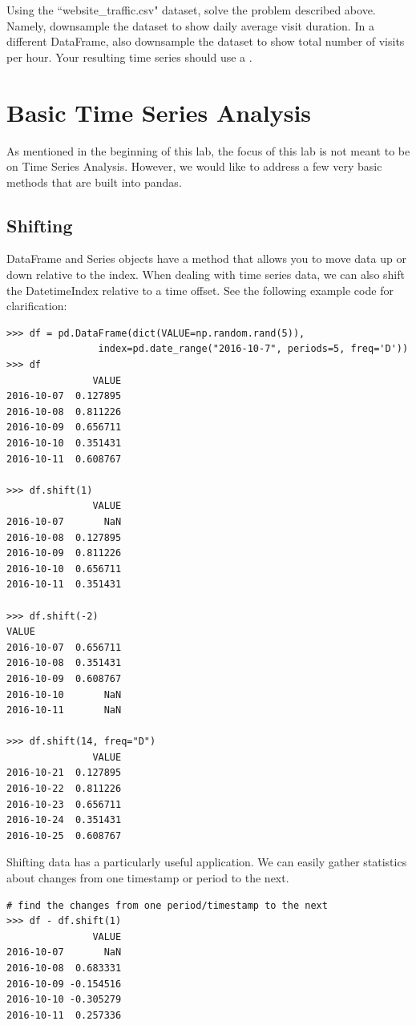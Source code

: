 \begin{problem}
Using the ``website\_traffic.csv" dataset, solve the problem described above. Namely, downsample the dataset to show daily average visit duration. In a different DataFrame, also downsample the dataset to show total number of visits per hour. Your resulting time series should use a .
\end{problem}

\section*{Basic Time Series Analysis}
As mentioned in the beginning of this lab, the focus of this lab is not meant to be on Time Series Analysis. However, we would like to address a few very basic methods that are built into pandas.

\subsection*{Shifting}
DataFrame and Series objects have a  method that allows you to move data up or down relative to the index. When dealing with time series data, we can also shift the DatetimeIndex relative to a time offset. See the following example code for clarification:

\begin{lstlisting}
>>> df = pd.DataFrame(dict(VALUE=np.random.rand(5)),
                index=pd.date_range("2016-10-7", periods=5, freq='D'))
>>> df
               VALUE
2016-10-07  0.127895
2016-10-08  0.811226
2016-10-09  0.656711
2016-10-10  0.351431
2016-10-11  0.608767

>>> df.shift(1)
               VALUE
2016-10-07       NaN
2016-10-08  0.127895
2016-10-09  0.811226
2016-10-10  0.656711
2016-10-11  0.351431

>>> df.shift(-2)
VALUE
2016-10-07  0.656711
2016-10-08  0.351431
2016-10-09  0.608767
2016-10-10       NaN
2016-10-11       NaN

>>> df.shift(14, freq="D")
               VALUE
2016-10-21  0.127895
2016-10-22  0.811226
2016-10-23  0.656711
2016-10-24  0.351431
2016-10-25  0.608767
\end{lstlisting}

Shifting data has a particularly useful application. We can easily gather statistics about changes from one timestamp or period to the next.

\begin{lstlisting}
# find the changes from one period/timestamp to the next
>>> df - df.shift(1)
               VALUE
2016-10-07       NaN
2016-10-08  0.683331
2016-10-09 -0.154516
2016-10-10 -0.305279
2016-10-11  0.257336
\end{lstlisting}

